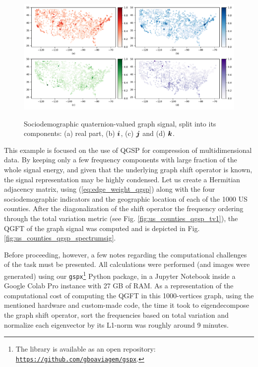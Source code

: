 \begin{figure}
    \centering
    \caption{Sociodemographic quaternion-valued graph signal, split into its components: (a) real part, (b) $\boldsymbol{i}$, (c) $\boldsymbol{j}$ and (d) $\boldsymbol{k}$.}
    \includegraphics[width=0.95\linewidth]{Figures/usa_example/us_signal.pdf}
    \floatsource
    \label{fig:us_signal}
\end{figure}

This example is focused on the use of QGSP for compression of multidimensional data. By keeping only a few frequency components with large fraction of the whole signal energy, and given that the underlying graph shift operator is known, the signal representation may be highly condensed. Let us create a Hermitian adjacency matrix, using (\ref{eq:edge_weight_qgsp}) along with the four sociodemographic indicators and the geographic location of each of the 1000 US counties. After the diagonalization of the shift operator the frequency ordering through the total variation metric (see Fig. \ref{fig:us_counties_qgsp_tv1}), the QGFT of the graph signal was computed and is depicted in Fig. \ref{fig:us_counties_qgsp_spectrumsig}.

Before proceeding, however, a few notes regarding the computational challenges of the task must be presented. All calculations were performed (and images were generated) using our \texttt{gspx}\footnote{The library is available as an open repository: \texttt{\url{https://github.com/gboaviagem/gspx}}.} Python package, in a Jupyter Notebook inside a Google Colab Pro instance with 27 GB of RAM. As a representation of the computational cost of computing the QGFT in this 1000-vertices graph, using the mentioned hardware and custom-made code, the time it took to eigendecompose the graph shift operator, sort the frequencies based on total variation and normalize each eigenvector by its L1-norm was roughly around 9 minutes.


